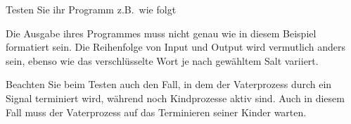Testen Sie ihr Programm z.B.\ wie folgt


Die Ausgabe ihres Programmes muss nicht genau wie in diesem Beispiel
formatiert sein. Die Reihenfolge von Input und Output wird vermutlich
anders sein, ebenso wie das verschlüsselte Wort je nach gewähltem Salt
variiert.

Beachten Sie beim Testen auch den Fall, in dem der Vaterprozess durch
ein Signal terminiert wird, während noch Kindprozesse aktiv sind. Auch
in diesem Fall muss der Vaterprozess auf das Terminieren seiner Kinder
warten.

\osueguidelinestwo


